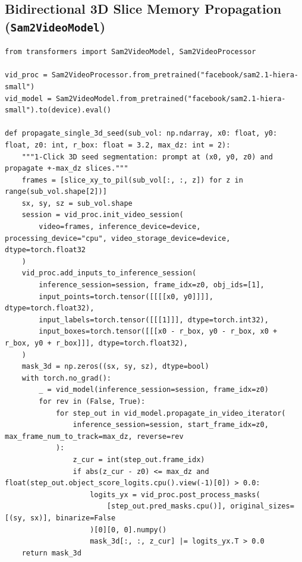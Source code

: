 \documentclass[10.5pt,a4paper]{article}
\begin{document}
\subsection{Bidirectional 3D Slice Memory Propagation (\texttt{Sam2VideoModel})}

\begin{lstlisting}[style=pybmed]
from transformers import Sam2VideoModel, Sam2VideoProcessor

vid_proc = Sam2VideoProcessor.from_pretrained("facebook/sam2.1-hiera-small")
vid_model = Sam2VideoModel.from_pretrained("facebook/sam2.1-hiera-small").to(device).eval()

def propagate_single_3d_seed(sub_vol: np.ndarray, x0: float, y0: float, z0: int, r_box: float = 3.2, max_dz: int = 2):
    """1-Click 3D seed segmentation: prompt at (x0, y0, z0) and propagate +-max_dz slices."""
    frames = [slice_xy_to_pil(sub_vol[:, :, z]) for z in range(sub_vol.shape[2])]
    sx, sy, sz = sub_vol.shape
    session = vid_proc.init_video_session(
        video=frames, inference_device=device, processing_device="cpu", video_storage_device=device, dtype=torch.float32
    )
    vid_proc.add_inputs_to_inference_session(
        inference_session=session, frame_idx=z0, obj_ids=[1],
        input_points=torch.tensor([[[[x0, y0]]]], dtype=torch.float32),
        input_labels=torch.tensor([[[1]]], dtype=torch.int32),
        input_boxes=torch.tensor([[[x0 - r_box, y0 - r_box, x0 + r_box, y0 + r_box]]], dtype=torch.float32),
    )
    mask_3d = np.zeros((sx, sy, sz), dtype=bool)
    with torch.no_grad():
        _ = vid_model(inference_session=session, frame_idx=z0)
        for rev in (False, True):
            for step_out in vid_model.propagate_in_video_iterator(
                inference_session=session, start_frame_idx=z0, max_frame_num_to_track=max_dz, reverse=rev
            ):
                z_cur = int(step_out.frame_idx)
                if abs(z_cur - z0) <= max_dz and float(step_out.object_score_logits.cpu().view(-1)[0]) > 0.0:
                    logits_yx = vid_proc.post_process_masks(
                        [step_out.pred_masks.cpu()], original_sizes=[(sy, sx)], binarize=False
                    )[0][0, 0].numpy()
                    mask_3d[:, :, z_cur] |= logits_yx.T > 0.0
    return mask_3d
\end{lstlisting}

\end{document}
